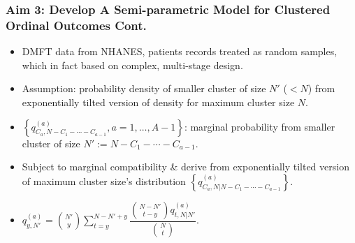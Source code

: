 \documentclass[hyperref={bookmarks=false},aspectratio=169]{beamer}
\begin{document}
\begin{frame}
\frametitle{Aim 3: Develop A Semi-parametric Model for Clustered Ordinal Outcomes Cont.}

\begin{itemize}
    \item DMFT data from NHANES, patients records treated as random samples, which in fact based on complex, multi-stage design.
    \item \alert{Assumption}: probability density of smaller cluster of size $N'$ ($<N$) from exponentially tilted version of density for maximum cluster size $N$.
    \item $\left\lbrace q^{(a)}_{C_{a},N - C_1 - \cdots - C_{a-1}}, a=1, \dots, A-1 \right\rbrace$: marginal probability from smaller cluster of size $N' := {N - C_1 - \cdots - C_{a-1}}$.
    \item Subject to \alert{marginal compatibility} {\&} derive from exponentially tilted version of maximum cluster size's distribution $\left\lbrace q^{(a)}_{C_{a},N | N - C_1 - \cdots - C_{a-1}} \right\rbrace$.
    \item $q^{(a)}_{y,N'} =\binom{N'}{y} \displaystyle \sum_{t=y}^{N-N'+y} \dfrac{\binom{N-N'}{t-y} q^{(a)}_{t,N|N'}}{\binom{N}{t}}$.
\end{itemize}

\end{frame}
\end{document}
